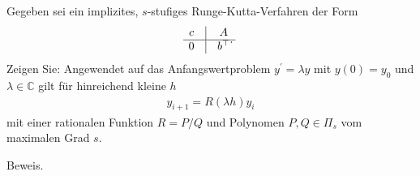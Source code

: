 \begin{exercise}
Gegeben sei ein implizites, $s$-stufiges Runge-Kutta-Verfahren der Form
\renewcommand{\arraystretch}{1.5}
\begin{align}
  \begin{matrix}
  c & \vline & A \\
  \hline
  0 & \vline & b^{\top}
  \end{matrix}.
\end{align}
Zeigen Sie: Angewendet auf das Anfangswertproblem $y^{\prime} = \lambda y$ mit
$y(0) = y_0$ und $\lambda \in \mathbb{C}$ gilt für hinreichend kleine $h$
\begin{align}
  y_{i+1} = R(\lambda h)y_i
\end{align}
mit einer rationalen Funktion $R = P/Q$ und Polynomen $P,Q \in \Pi_s$ vom
maximalen Grad $s$.
\end{exercise}
\begin{solution}
Beweis.
\end{solution}
